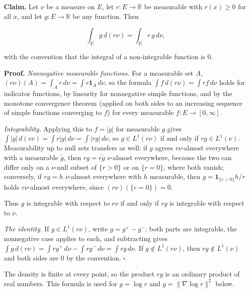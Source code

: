 \documentclass[11pt,a4paper]{article}
\begin{document}
\textbf{Claim.} Let \(\nu\) be a measure on \(E\), let \(r:E\to\mathbb R\) be measurable with \(r(x)\ge0\) for all \(x\), and let \(g:E\to\mathbb R\) be any function. Then


\[\int_Eg\,d(r\nu)=\int_Er\,g\,d\nu,\]


with the convention that the integral of a non-integrable function is \(0\).




\textbf{Proof.} \emph{Nonnegative measurable functions.} For a measurable set \(A\), \((r\nu)(A)=\int_Ar\,d\nu=\int r\mathbf 1_A\,d\nu\), so the formula \(\int f\,d(r\nu)=\int rf\,d\nu\) holds for indicator functions, by linearity for nonnegative simple functions, and by the monotone convergence theorem (applied on both sides to an increasing sequence of simple functions converging to \(f\)) for every measurable \(f:E\to[0,\infty]\).




\emph{Integrability.} Applying this to \(f=|g|\) for measurable \(g\) gives \(\int|g|\,d(r\nu)=\int r|g|\,d\nu=\int|rg|\,d\nu\), so \(g\in L^1(r\nu)\) if and only if \(rg\in L^1(\nu)\). Measurability up to null sets transfers as well: if \(g\) agrees \(r\nu\)-almost everywhere with a measurable \(\tilde g\), then \(rg=r\tilde g\) \(\nu\)-almost everywhere, because the two can differ only on a \(\nu\)-null subset of \(\{r>0\}\) or on \(\{r=0\}\), where both vanish; conversely, if \(rg=h\) \(\nu\)-almost everywhere with \(h\) measurable, then \(g=\mathbf 1_{\{r>0\}}h/r\) holds \(r\nu\)-almost everywhere, since \((r\nu)(\{r=0\})=0\).




Thus \(g\) is integrable with respect to \(r\nu\) if and only if \(rg\) is integrable with respect to \(\nu\).




\emph{The identity.} If \(g\in L^1(r\nu)\), write \(g=g^+-g^-\); both parts are integrable, the nonnegative case applies to each, and subtracting gives \(\int g\,d(r\nu)=\int rg^+\,d\nu-\int rg^-\,d\nu=\int rg\,d\nu\). If \(g\notin L^1(r\nu)\), then \(rg\notin L^1(\nu)\) and both sides are \(0\) by the convention. \(\square\)




The density is finite at every point, so the product \(rg\) is an ordinary product of real numbers. This formula is used for \(g=\log r\) and \(g=\|\nabla\log r\|^2\) below.
\end{document}
